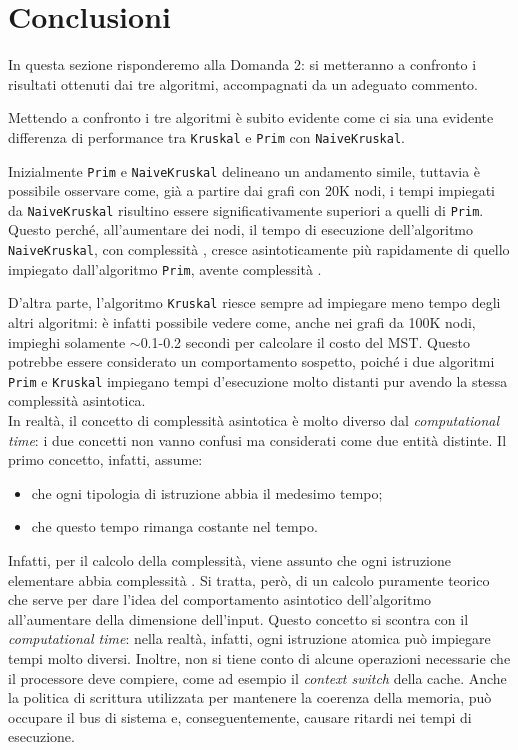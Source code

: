 \section{Conclusioni} \label{conc}
In questa sezione risponderemo alla Domanda 2: si metteranno a confronto i risultati ottenuti dai tre algoritmi, accompagnati da un adeguato commento.\acapo

Mettendo a confronto i tre algoritmi è subito evidente come ci sia una evidente differenza di performance tra \texttt{Kruskal} e \texttt{Prim} con \texttt{NaiveKruskal}.


Inizialmente \texttt{Prim} e \texttt{NaiveKruskal} delineano un andamento simile, tuttavia è possibile osservare come, già a partire dai grafi con 20K nodi, i tempi impiegati da \texttt{NaiveKruskal} risultino essere significativamente superiori a quelli di \texttt{Prim}. Questo perché, all'aumentare dei nodi, il tempo di esecuzione dell'algoritmo \texttt{NaiveKruskal}, con complessità , cresce asintoticamente più rapidamente di quello impiegato dall'algoritmo \texttt{Prim}, avente complessità .\eqcapo

D'altra parte, l'algoritmo \texttt{Kruskal} riesce sempre ad impiegare meno tempo degli altri algoritmi: è infatti possibile vedere come, anche nei grafi da 100K nodi, impieghi solamente $\sim$0.1-0.2 secondi per calcolare il costo del MST. Questo potrebbe essere considerato un comportamento sospetto, poiché i due algoritmi \texttt{Prim} e \texttt{Kruskal} impiegano tempi d'esecuzione molto distanti pur avendo la stessa complessità asintotica. \\
In realtà, il concetto di complessità asintotica è molto diverso dal \emph{computational time}: i due concetti non vanno confusi ma considerati come due entità distinte. Il primo concetto, infatti, assume:
\begin{itemize}
	\item che ogni tipologia di istruzione abbia il medesimo tempo;
	\item che questo tempo rimanga costante nel tempo.
\end{itemize} 
Infatti, per il calcolo della complessità, viene assunto che ogni istruzione elementare abbia complessità . Si tratta, però, di un calcolo puramente teorico che serve per dare l'idea del comportamento asintotico dell'algoritmo all'aumentare della dimensione dell'input.\eqcapo
Questo concetto si scontra con il \emph{computational time}: nella realtà, infatti, ogni istruzione atomica può impiegare tempi molto diversi. Inoltre, non si tiene conto di alcune operazioni necessarie che il processore deve compiere, come ad esempio il \emph{context switch} della cache. Anche la politica di scrittura utilizzata per mantenere la coerenza della memoria, può occupare il bus di sistema e, conseguentemente, causare ritardi nei tempi di esecuzione.\acapo

